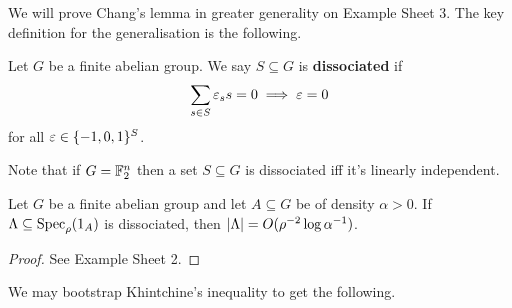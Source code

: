 \documentclass{article}
\begin{document}
We will prove Chang's lemma in greater generality on Example Sheet 3. The key definition for the generalisation is the following.

\begin{ndef}
  Let $G$ be a finite abelian group. We say $S \subseteq G$ is {\bf dissociated} if
  $$\sum_{s \in S} \varepsilon_s s = 0 \implies \varepsilon = 0$$
  for all $\varepsilon \in \{-1, 0, 1\}^S$.
\end{ndef}

Note that if $G = \mathbb F_2^n$ then a set $S \subseteq G$ is dissociated iff it's linearly independent.

\newlec

\begin{nthm}
  Let $G$  be a finite abelian group and let $A \subseteq G$ be of density $\alpha > 0$. If $\Lambda \subseteq \operatorname{Spec}_\rho(1_A)$ is dissociated, then $\left\lvert \Lambda\right\rvert = O(\rho^{-2}\log\alpha^{-1})$.
\end{nthm}
\begin{proof}
  See Example Sheet 2.
\end{proof}

We may bootstrap Khintchine's inequality to get the following.
\end{document}
